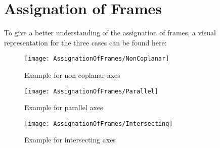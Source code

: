 \chapter{Assignation of Frames}

To give a better understanding of the assignation of frames, a visual representation for the three cases can be found here:

\begin{figure}[H]
	
		\texttt{[image: AssignationOfFrames/NonCoplanar]}
		\caption{Example for non coplanar axes \cite{DenavitHartenbergKonventionen}}
		\label{fig:NonCoplanar}
	\end{figure}
	\begin{figure}[H]
		\texttt{[image: AssignationOfFrames/Parallel]}
		\caption{Example for parallel axes \cite{DenavitHartenbergKonventionen}}
		\label{fig:Parallel}
	\end{figure}
	\begin{figure}[H]
		\texttt{[image: AssignationOfFrames/Intersecting]}
		\caption{Example for intersecting axes \cite{DenavitHartenbergKonventionen}}
		\label{fig:Intersecting}
	
\end{figure}